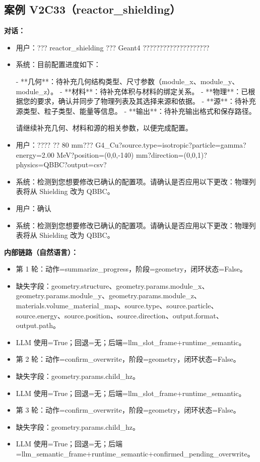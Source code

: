 \documentclass[11pt]{ctexart}
\begin{document}
\subsection{案例 V2C33（reactor\_shielding）}
\textbf{对话：}
\begin{itemize}
\item 用户：??? reactor\_shielding ??? Geant4 ????????????????????
\item 系统：目前配置进度如下：

- **几何**：待补充几何结构类型、尺寸参数（module\_x、module\_y、module\_z）。
- **材料**：待补充体积与材料的绑定关系。
- **物理**：已根据您的要求，确认并同步了物理列表及其选择来源和依据。
- **源**：待补充源类型、粒子类型、能量等信息。
- **输出**：待补充输出格式和保存路径。

请继续补充几何、材料和源的相关参数，以便完成配置。
\item 用户：???? ?? 80 mm??? G4\_Cu?source.type=isotropic?particle=gamma?energy=2.00 MeV?position=(0,0,-140) mm?direction=(0,0,1)?physics=QBBC?output=csv?
\item 系统：检测到您想要修改已确认的配置项。请确认是否应用以下更改：物理列表将从 Shielding 改为 QBBC。
\item 用户：确认
\item 系统：检测到您想要修改已确认的配置项。请确认是否应用以下更改：物理列表将从 Shielding 改为 QBBC。
\end{itemize}
\textbf{内部链路（自然语言）：}
\begin{itemize}
\item 第 1 轮：动作=summarize\_progress，阶段=geometry，闭环状态=False。
\item 缺失字段：geometry.structure、geometry.params.module\_x、geometry.params.module\_y、geometry.params.module\_z、materials.volume\_material\_map、source.type、source.particle、source.energy、source.position、source.direction、output.format、output.path。
\item LLM 使用=True；回退=无；后端=llm\_slot\_frame+runtime\_semantic。
\item 第 2 轮：动作=confirm\_overwrite，阶段=geometry，闭环状态=False。
\item 缺失字段：geometry.params.child\_hz。
\item LLM 使用=True；回退=无；后端=llm\_slot\_frame+runtime\_semantic。
\item 第 3 轮：动作=confirm\_overwrite，阶段=geometry，闭环状态=False。
\item 缺失字段：geometry.params.child\_hz。
\item LLM 使用=True；回退=无；后端=llm\_semantic\_frame+runtime\_semantic+confirmed\_pending\_overwrite。
\end{itemize}
\end{document}
